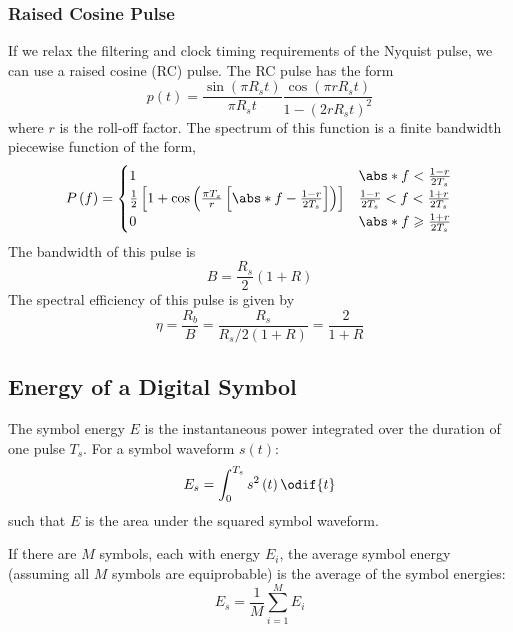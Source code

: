 \documentclass{article}
\begin{document}
\subsubsection{Raised Cosine Pulse}
If we relax the filtering and clock timing requirements of the Nyquist
pulse, we can use a raised cosine (RC) pulse. The RC pulse has the form
\begin{equation*}
    p\left( t \right) = \frac{\sin{\left( \pi R_s t \right)}}{\pi R_s t} \frac{\cos{\left( \pi r R_s t \right)}}{1 - \left( 2 r R_s t \right)^2}
\end{equation*}
where \(r\) is the roll-off factor. The spectrum of this function is
a finite bandwidth piecewise function of the form,
\begin{equation*}
    P\left( f \right) =
    \begin{cases}
        1                                                                                                                & \abs*{f} < \frac{1-r}{2T_s}             \\
        \frac{1}{2} \left[ 1 + \cos{\left( \frac{\pi T_s}{r} \left[ \abs*{f} - \frac{1-r}{2T_s} \right] \right)} \right] & \frac{1-r}{2T_s} < f < \frac{1+r}{2T_s} \\
        0                                                                                                                & \abs*{f} \geqslant \frac{1+r}{2T_s}
    \end{cases}
\end{equation*}
The bandwidth of this pulse is
\begin{equation*}
    B = \frac{R_s}{2} \left( 1 + R \right)
\end{equation*}
The spectral efficiency of this pulse is given by
\begin{equation*}
    \eta = \frac{R_b}{B} = \frac{R_s}{R_s/2 \left( 1 + R \right)} = \frac{2}{1 + R}
\end{equation*}
\subsection{Energy of a Digital Symbol}
The symbol energy \(E\) is the instantaneous power integrated over the
duration of one pulse \(T_s\). For a symbol waveform \(s\left( t
\right)\):
\begin{equation*}
    E_s = \int_0^{T_s} s^2\left( t \right) \odif{t}
\end{equation*}
such that \(E\) is the area under the squared symbol waveform.

If there are \(M\) symbols, each with energy \(E_i\), the average
symbol energy (assuming all \(M\) symbols are equiprobable) is the
average of the symbol energies:
\begin{equation*}
    E_s = \frac{1}{M} \sum_{i=1}^{M} E_i
\end{equation*}
\end{document}
